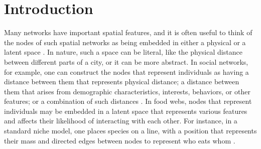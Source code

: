 \documentclass[%
 reprint,
 amsmath,amssymb,
 aps,
]{revtex4-1}
\begin{document}



\section{Introduction} \label{sec:introduction}

Many networks have important spatial features, and it is often useful to think of the nodes of such spatial networks as being embedded in either a physical or a latent space \cite{barthelemy,newman2018}. In nature, such a space can be literal, like the physical distance between different parts of a city, or it can be more abstract. In social networks, for example, one can construct the nodes that represent individuals as having a distance between them that represents physical distance; a distance between them that arises from demographic characteristics, interests, behaviors, or other features; or a combination of such distances \cite{social}. In food webs, nodes that represent individuals may be embedded in a latent space that represents various features and affects their likelihood of interacting with each other. For instance, in a standard niche model, one places species on a line, with a position that represents their mass and directed edges between nodes to represent who eats whom \cite{foodwebs}.
 
\end{document}
